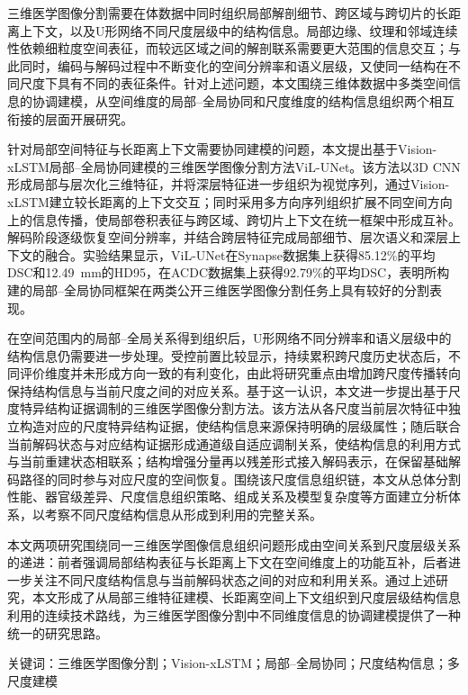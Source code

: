 
三维医学图像分割需要在体数据中同时组织局部解剖细节、跨区域与跨切片的长距离上下文，以及U形网络不同尺度层级中的结构信息。局部边缘、纹理和邻域连续性依赖细粒度空间表征，而较远区域之间的解剖联系需要更大范围的信息交互；与此同时，编码与解码过程中不断变化的空间分辨率和语义层级，又使同一结构在不同尺度下具有不同的表征条件。针对上述问题，本文围绕三维体数据中多类空间信息的协调建模，从空间维度的局部--全局协同和尺度维度的结构信息组织两个相互衔接的层面开展研究。

针对局部空间特征与长距离上下文需要协同建模的问题，本文提出基于Vision-xLSTM局部--全局协同建模的三维医学图像分割方法ViL-UNet。该方法以3D CNN形成局部与层次化三维特征，并将深层特征进一步组织为视觉序列，通过Vision-xLSTM建立较长距离的上下文交互；同时采用多方向序列组织扩展不同空间方向上的信息传播，使局部卷积表征与跨区域、跨切片上下文在统一框架中形成互补。解码阶段逐级恢复空间分辨率，并结合跨层特征完成局部细节、层次语义和深层上下文的融合。实验结果显示，ViL-UNet在Synapse数据集上获得85.12\%的平均DSC和12.49~mm的HD95，在ACDC数据集上获得92.79\%的平均DSC，表明所构建的局部--全局协同框架在两类公开三维医学图像分割任务上具有较好的分割表现。

在空间范围内的局部--全局关系得到组织后，U形网络不同分辨率和语义层级中的结构信息仍需要进一步处理。受控前置比较显示，持续累积跨尺度历史状态后，不同评价维度并未形成方向一致的有利变化，由此将研究重点由增加跨尺度传播转向保持结构信息与当前尺度之间的对应关系。基于这一认识，本文进一步提出基于尺度特异结构证据调制的三维医学图像分割方法。该方法从各尺度当前层次特征中独立构造对应的尺度特异结构证据，使结构信息来源保持明确的层级属性；随后联合当前解码状态与对应结构证据形成通道级自适应调制关系，使结构信息的利用方式与当前重建状态相联系；结构增强分量再以残差形式接入解码表示，在保留基础解码路径的同时参与对应尺度的空间恢复。围绕该尺度信息组织链，本文从总体分割性能、器官级差异、尺度信息组织策略、组成关系及模型复杂度等方面建立分析体系，以考察不同尺度结构信息从形成到利用的完整关系。

本文两项研究围绕同一三维医学图像信息组织问题形成由空间关系到尺度层级关系的递进：前者强调局部结构表征与长距离上下文在空间维度上的功能互补，后者进一步关注不同尺度结构信息与当前解码状态之间的对应和利用关系。通过上述研究，本文形成了从局部三维特征建模、长距离空间上下文组织到尺度层级结构信息利用的连续技术路线，为三维医学图像分割中不同维度信息的协调建模提供了一种统一的研究思路。

\noindent\hei 关键词：\song 三维医学图像分割；Vision-xLSTM；局部--全局协同；尺度结构信息；多尺度建模
